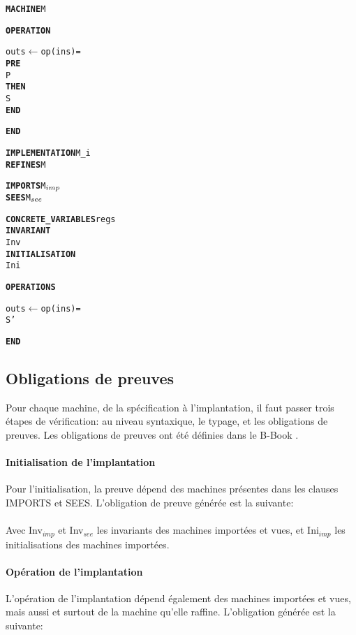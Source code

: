 \setlength{\columnseprule}{0.05cm}
\begin{multicols}{2}
\begin{alltt}
\textbf{MACHINE} M

\textbf{OPERATION}

outs \(\leftarrow\) op(ins) =
  \textbf{PRE}
    P
  \textbf{THEN}
    S
  \textbf{END}

\textbf{END}
\end{alltt}
\columnbreak
\begin{alltt}
\textbf{IMPLEMENTATION} M\_i
\textbf{REFINES} M

\textbf{IMPORTS} M\(\sb{imp}\)
\textbf{SEES} M\(\sb{see}\)

\textbf{CONCRETE\_VARIABLES} regs
\textbf{INVARIANT}
  Inv
\textbf{INITIALISATION}
  Ini

\textbf{OPERATIONS}
  
outs \(\leftarrow\) op(ins) =
  S'

\textbf{END}
\end{alltt}
\end{multicols}



\subsection{Obligations de preuves}

Pour chaque machine, de la spécification à l'implantation, il faut
passer trois étapes de vérification: au niveau syntaxique, le typage, et les obligations de preuves.  
Les obligations de preuves ont été définies dans le B-Book \cite{JRA}. 

\paragraph{Initialisation de l'implantation} Pour l'initialisation, la preuve
dépend des machines présentes dans les clauses IMPORTS et
SEES. L'obligation de preuve générée est la suivante:\\

 \\

Avec Inv$_{imp}$ et  Inv$_{see}$ les invariants des machines importées et vues,
et Ini$_{imp}$ les initialisations des machines importées. \\


\paragraph{Opération de l'implantation}
L'opération de l'implantation dépend également des machines importées et vues, mais
aussi et surtout de la machine qu'elle raffine. L'obligation générée est la
suivante:\\

